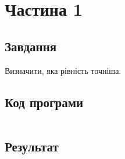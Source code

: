 \section{Частина 1}
\label{sec:task1}

\subsection{Завдання}
\label{subsec:task1_task}

Визначити, яка рівність точніша.

\subsection{Код програми}
\label{subsec:task1_code}
\inputminted{python}{../src/task1.py}

\subsection{Результат}
\label{subsec:task1_result}

